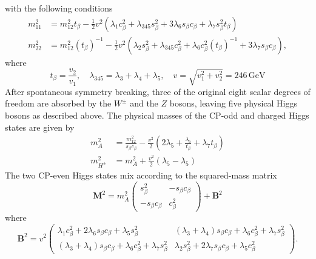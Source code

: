 with the following conditions
\begin{equation}
    \label{4.4}
    \begin{split}
        m_{11}^2 &= m_{12}^2 t_{\beta} - \frac{1}{2}v^2(\lambda_1  c^2_{\beta} + \lambda_{345} s^2_{\beta} + 3\lambda_6 s_{\beta} c_{\beta} + \lambda_7  s^2_{\beta} t_{\beta})  \\
        m_{22}^2 &= m_{12}^2( t_{\beta})^{-1} - \frac{1}{2}v^2(\lambda_2  s^2_{\beta} + \lambda_{345} c^2_{\beta} + \lambda_6 c^2_{\beta}( t_{\beta})^{-1} + 3\lambda_7  s_{\beta} c_{\beta}  ),
    \end{split}
\end{equation}
where 
$$ t_{\beta}=\frac{v_2}{v_1}, \quad \lambda_{345} = \lambda_3+\lambda_4+\lambda_5, \quad v = \sqrt{v_1^2 + v_2^2} = 246\, \mathrm{GeV}$$
After spontaneous symmetry breaking, three of the original eight scalar degrees of freedom are absorbed by the $W^{\pm}$ and the $Z$ bosons, 
leaving five physical Higgs bosons as described above. The physical masses of the CP-odd and charged Higgs states are given by 
\begin{equation}
    \label{4.5}
    \begin{split}
        m^2_{A} &= \frac{m_{12}^2}{ s_{\beta} c_{\beta}} - \frac{v^2}{2}\left( 2\lambda_5 + \frac{\lambda_6}{ t_{\beta}} + \lambda_7  t_{\beta}  \right) \\ 
        m^2_{H^{\pm}} &= m_{A}^2 + \frac{v^2}{2}(\lambda_5 - \lambda_5)
    \end{split}
\end{equation}
The two CP-even Higgs states mix according to the squared-mass matrix 
\begin{equation}
    \label{4.6}
    \mathbf{M}^2 = m^2_{A}\begin{pmatrix}
         s^2_{\beta} & - s_{\beta}  c_{\beta} \\
        - s_{\beta} c_{\beta} &  c^2_{\beta} 
    \end{pmatrix} + \mathbf{B}^2
\end{equation}
where
$$\mathbf{B}^2 = v^2\begin{pmatrix}
    \lambda_1 c^2_{\beta} + 2 \lambda_6 s_{\beta} c_{\beta} + \lambda_5 s^2_{\beta}  & (\lambda_3+\lambda_4) s_{\beta} c_{\beta} + \lambda_6 c^2_{\beta} + \lambda_7  s^2_{\beta} \\
    (\lambda_3 + \lambda_4) s_{\beta} c_{\beta} + \lambda_6 c^2_{\beta} + \lambda_7 s^2_{\beta} & \lambda_2 s^2_{\beta} + 2 \lambda_7 s_{\beta} c_{\beta} + \lambda_5 c^2_{\beta} 
\end{pmatrix}.$$
